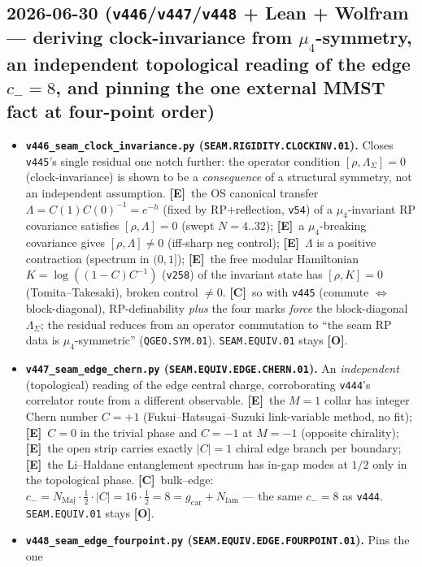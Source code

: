 \documentclass[11pt]{article}
\providecommand{\mE}{\textbf{[E]}}\providecommand{\mC}{\textbf{[C]}}
\providecommand{\mO}{\textbf{[O]}}\providecommand{\mX}{\textbf{[X]}}
\providecommand{\gcar}{g_{\mathrm{car}}}\providecommand{\Nfam}{N_{\mathrm{fam}}}
\begin{document}
\subsection*{2026-06-30 (\texttt{v446}/\texttt{v447}/\texttt{v448} + Lean + Wolfram --- deriving clock-invariance from $\mu_4$-symmetry, an independent topological reading of the edge $c_-{=}8$, and pinning the one external MMST fact at four-point order)}
\begin{itemize}
\item \textbf{\texttt{v446\_seam\_clock\_invariance.py} (\texttt{SEAM.RIGIDITY.CLOCKINV.01}).} Closes \texttt{v445}'s single
residual one notch further: the operator condition $[\rho,\Lambda_\Sigma]{=}0$ (clock-invariance) is shown to be a
\emph{consequence} of a structural symmetry, not an independent assumption. \mE\ the OS canonical transfer
$\Lambda{=}C(1)C(0)^{-1}{=}e^{-h}$ (fixed by RP$+$reflection, \texttt{v54}) of a $\mu_4$-invariant RP covariance
satisfies $[\rho,\Lambda]{=}0$ (swept $N{=}4..32$); \mE\ a $\mu_4$-breaking covariance gives $[\rho,\Lambda]\neq0$
(iff-sharp neg control); \mE\ $\Lambda$ is a positive contraction (spectrum in $(0,1]$); \mE\ the free modular
Hamiltonian $K{=}\log((1{-}C)C^{-1})$ (\texttt{v258}) of the invariant state has $[\rho,K]{=}0$ (Tomita--Takesaki),
broken control $\neq0$. \mC\ so with \texttt{v445} (commute $\Leftrightarrow$ block-diagonal), RP-definability
\emph{plus} the four marks \emph{force} the block-diagonal $\Lambda_\Sigma$; the residual reduces from an operator
commutation to ``the seam RP data is $\mu_4$-symmetric'' (\texttt{QGEO.SYM.01}). \texttt{SEAM.EQUIV.01} stays \mO.
\item \textbf{\texttt{v447\_seam\_edge\_chern.py} (\texttt{SEAM.EQUIV.EDGE.CHERN.01}).} An \emph{independent}
(topological) reading of the edge central charge, corroborating \texttt{v444}'s correlator route from a different
observable. \mE\ the $M{=}1$ collar has integer Chern number $C{=}{+}1$ (Fukui--Hatsugai--Suzuki link-variable
method, no fit); \mE\ $C{=}0$ in the trivial phase and $C{=}{-}1$ at $M{=}{-}1$ (opposite chirality); \mE\ the open
strip carries exactly $|C|{=}1$ chiral edge branch per boundary; \mE\ the Li--Haldane entanglement spectrum has
in-gap modes at $1/2$ only in the topological phase. \mC\ bulk--edge: $c_-{=}N_{\mathrm{Maj}}\cdot\tfrac12\cdot|C|
{=}16\cdot\tfrac12{=}8{=}\gcar{+}\Nfam$ --- the same $c_-{=}8$ as \texttt{v444}. \texttt{SEAM.EQUIV.01} stays \mO.
\item \textbf{\texttt{v448\_seam\_edge\_fourpoint.py} (\texttt{SEAM.EQUIV.EDGE.FOURPOINT.01}).} Pins the one

\end{itemize}
\end{document}
